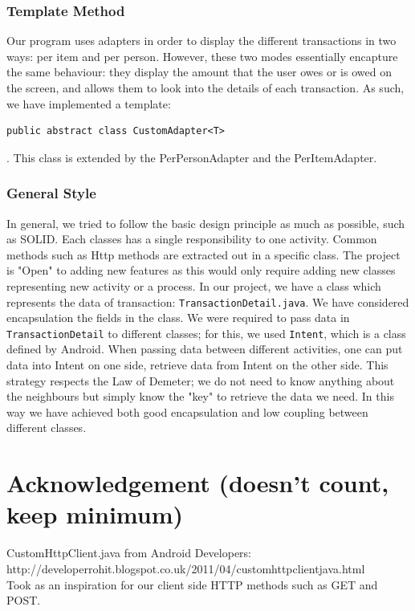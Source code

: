 \documentclass[a4paper,11pt]{article}
\begin{document}
\subsubsection*{Template Method}
Our program uses adapters in order to display the different transactions in two ways: per item and per person. However, these two modes essentially encapture the same behaviour: they display the amount that the user owes or is owed on the screen, and allows them to look into the details of each transaction. As such, we have implemented a template: 
\begin{verbatim}
public abstract class CustomAdapter<T> 
\end{verbatim}.
This class is extended by the PerPersonAdapter and the PerItemAdapter.

\subsubsection*{General Style}
In general, we tried to follow the basic design principle as much as possible, such as SOLID. Each classes has a single responsibility to one activity. Common methods such as Http methods are extracted out in a specific class. The project is "Open" to adding new features as this would only require adding new classes representing new activity or a process. In our project, we have a class which represents the data of transaction: \texttt{TransactionDetail.java}. We have considered encapsulation the fields in the class. We were required to pass data in \texttt{TransactionDetail} to different classes; for this, we used \texttt{Intent}, which is a class defined by Android. When passing data between different activities, one can put data into Intent on one side, retrieve data from Intent on the other side. This strategy respects the Law of Demeter; we do not need to know anything about the neighbours but simply know the "key" to retrieve the data we need. In this way we have achieved both good encapsulation and low coupling between different classes.
 
\section{Acknowledgement (doesn’t count, keep minimum)}

CustomHttpClient.java from Android Developers: http://developerrohit.blogspot.co.uk/2011/04/customhttpclientjava.html\\
Took as an inspiration for our client side HTTP methods such as GET and POST.
\end{document}
